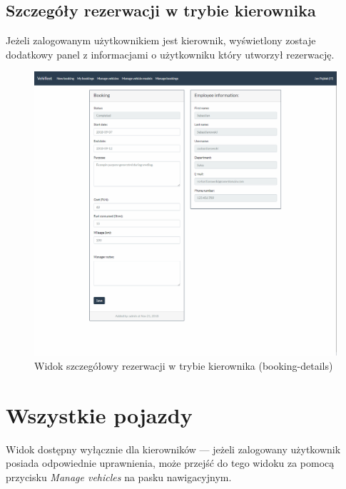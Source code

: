 \documentclass[eng,printmode,openany]{mgr}
\begin{document}
\begin{appendices}
		\newpage
		\subsection{Szczegóły rezerwacji w trybie kierownika}
		Jeżeli zalogowanym użytkownikiem jest kierownik, wyświetlony zostaje dodatkowy panel z informacjami o użytkowniku który utworzył rezerwację.
		\begin{figure}[H]
			\centering
			\includegraphics[width=\textwidth]{images/views/booking-detail-manager.png}
			\caption{Widok szczegółowy rezerwacji w trybie kierownika (booking-details)}
		\end{figure}
	
		\newpage
		\section{Wszystkie pojazdy}
		Widok dostępny wyłącznie dla kierowników — jeżeli zalogowany użytkownik posiada odpowiednie uprawnienia, może przejść do tego widoku za pomocą przycisku \textit{Manage vehicles} na pasku nawigacyjnym.
		

\end{appendices}
\end{document}
